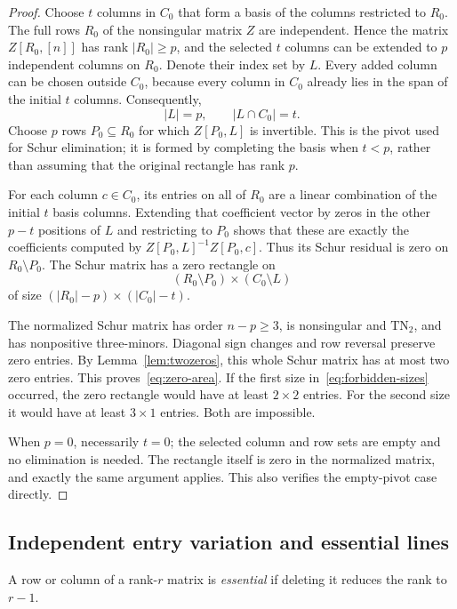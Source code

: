 \documentclass[10pt,a4paper]{article}
\theoremstyle{definition}
\theoremstyle{remark}
\numberwithin{equation}{section}
\begin{document}
\begin{proof}
Choose $t$ columns in $C_0$ that form a basis of the columns
restricted to $R_0$. The full rows $R_0$ of the nonsingular matrix
$Z$ are independent. Hence the matrix $Z[R_0,[n]]$ has rank
$|R_0|\geq p$, and the selected $t$ columns can be extended to
$p$ independent columns on $R_0$. Denote their index set by $L$.
Every added column can be chosen outside $C_0$, because every
column in $C_0$ already lies in the span of the initial $t$ columns.
Consequently,
\[
 |L|=p,\qquad |L\cap C_0|=t.
\]
Choose $p$ rows $P_0\subseteq R_0$ for which $Z[P_0,L]$ is
invertible. This is the pivot used for Schur elimination; it is
formed by completing the basis when $t<p$, rather than assuming
that the original rectangle has rank $p$.

For each column $c\in C_0$, its entries on all of $R_0$ are a
linear combination of the initial $t$ basis columns. Extending that
coefficient vector by zeros in the other $p-t$ positions of $L$
and restricting to $P_0$ shows that these are exactly the coefficients
computed by $Z[P_0,L]^{-1}Z[P_0,c]$. Thus its Schur residual is
zero on $R_0\setminus P_0$. The Schur matrix has a zero rectangle
on
\[
 (R_0\setminus P_0)\times(C_0\setminus L)
\]
of size $(|R_0|-p)\times(|C_0|-t)$.

The normalized Schur matrix has order $n-p\geq3$, is nonsingular
and $\mathrm{TN}_2$, and has nonpositive three-minors. Diagonal
sign changes and row reversal preserve zero entries. By
Lemma~\ref{lem:twozeros}, this whole Schur matrix has at most two
zero entries. This proves~\eqref{eq:zero-area}.
If the first size in~\eqref{eq:forbidden-sizes} occurred, the zero
rectangle would have at least $2\times2$ entries. For the second
size it would have at least $3\times1$ entries. Both are impossible.

When $p=0$, necessarily $t=0$; the selected column and row sets
are empty and no elimination is needed. The rectangle itself is
zero in the normalized matrix, and exactly the same argument
applies. This also verifies the empty-pivot case directly.
\end{proof}


\subsection{Independent entry variation and essential lines}\label{sec:essential}

A row or column of a rank-$r$ matrix is \emph{essential} if
deleting it reduces the rank to $r-1$.
\end{document}
